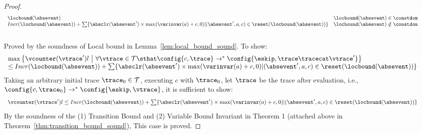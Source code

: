 \begin{proof}
\[\begin{array}{ll}
  \locbound(\absevent) & \locbound(\absevent) \in \constdom \\
  Incr(\locbound(\absevent)) + 
  \sum\{\absclr(\absevent') \times \max(\varinvar(a) + c, 0) | (\absevent', a, c) \in \reset(\locbound(\absevent))\} 
  & \locbound(\absevent) \notin \constdom
\end{array}
\]
  \caseL{$\locbound(\absevent) \in \constdom$}
  \\
  Proved by the soundness of Local bound in Lemma~\ref{lem:local_bound_sound}.
  \caseL{$\locbound(\absevent) \notin \constdom$}
To show:
\[
  \begin{array}{l}
    \max \left\{ \vcounter(\vtrace') l ~ \middle\vert~
\forall \vtrace \in \mathcal{T} \sthat  \config{{c}, \trace} \to^{*} \config{\eskip, \trace\tracecat\vtrace'} \right\} 
\\
\leq 
Incr(\locbound(\absevent)) + 
\sum\{\absclr(\absevent') \times \max(\varinvar(a) + c, 0) | (\absevent', a, c) \in \reset(\locbound(\absevent))\} 
\end{array}
\]
  Taking an arbitrary initial trace
  $\trace_0 \in \mathcal{T}$, 
  executing $c$ with $\trace_0$, let $\trace$ be the trace after evaluation, i.e., $\config{{c}, \trace_0} \to^{*} \config{\eskip,\vtrace}$, it is sufficient to show:
  \[ 
    \begin{array}{l}
      \vcounter(\vtrace') l \leq 
    Incr(\locbound(\absevent)) + 
    \sum\{\absclr(\absevent') \times \max(\varinvar(a) + c, 0) | (\absevent', a, c) \in \reset(\locbound(\absevent))\}
  \end{array}
  \]
%
 By the soundness of the (1) Transition Bound and (2) Variable Bound Invariant 
 in \cite{sinn2017complexity} Theorem 1 (attached above in Theorem~\ref{thm:transition_bound_sound}), 
This case is proved.
\end{proof}

